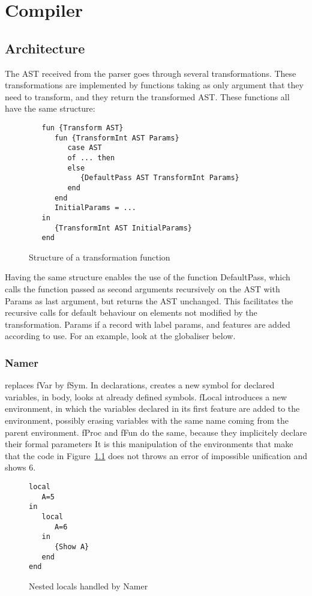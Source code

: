 \documentclass[a4paper]{memoir}
\begin{document}
\chapter{Compiler}
\section{Architecture}
The AST received from the parser goes through several transformations. These transformations are implemented by functions taking as only argument that they need to transform, and they return the transformed AST.
These functions all have the same structure:
\begin{figure}[h]
\begin{lstlisting}
   fun {Transform AST}
      fun {TransformInt AST Params}
         case AST
         of ... then
         else
            {DefaultPass AST TransformInt Params}
         end
      end
      InitialParams = ...
   in
      {TransformInt AST InitialParams}
   end
\end{lstlisting}
\caption{Structure of a transformation function}
\end{figure}
Having the same structure enables the use of the function DefaultPass, which calls the function passed as second arguments recursively on the AST with Params as last argument, but returns the AST unchanged. This facilitates the recursive calls for default behaviour on elements not modified by the transformation.
Params if a record with label params, and features are added according to use. For an example, look at the globaliser below.%
\subsection{Namer}
replaces fVar by fSym. In declarations, creates a new symbol for declared variables, in body, looks at already defined symbols.
fLocal introduces a new environment, in which the variables declared in its first feature are added to the environment, possibly erasing variables with the same name coming from the parent environment.
fProc and fFun do the same, because they implicitely declare their formal parameters %
It is this manipulation of the environments that make that the code in Figure~\ref{fig:namer_nested_locals} does not throws an error of impossible unification and shows 6.
\begin{figure}
\begin{lstlisting}
local
   A=5
in
   local 
      A=6
   in
      {Show A}
   end
end
\end{lstlisting}
\caption{Nested locals handled by Namer}
\label{fig:namer_nested_locals}
\end{figure}
\end{document}
